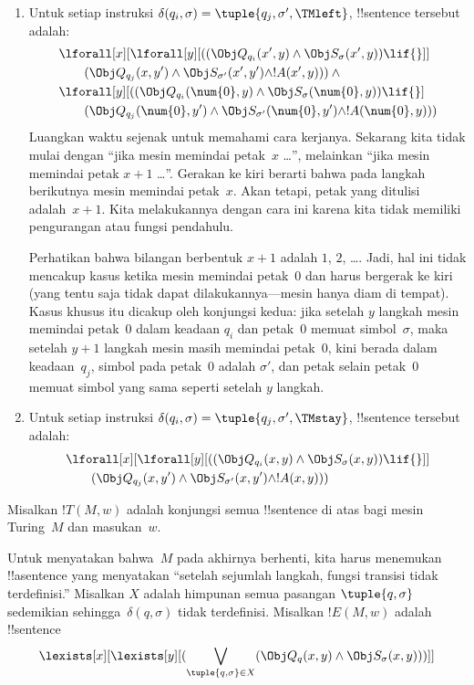 \documentclass[../../../include/open-logic-section]{subfiles}
\begin{document}
\begin{enumerate}
\begin{enumerate}
\item {} Untuk setiap instruksi $\delta(q_i, \sigma) =
  \tuple{q_j, \sigma', \TMleft}$, !!{sentence} tersebut adalah:
\begin{align*}
& \lforall[x][\lforall[y][
    ((\Obj Q_{q_i}(x', y) \land \Obj S_{\sigma}(x', y)) \lif {}]]\\
& \qquad   (\Obj Q_{q_j}(x, y') \land \Obj S_{\sigma'}(x', y') \land
!A(x', y))) \land {}\\
& \lforall[y][((\Obj Q_{q_i}(\num{0}, y) \land \Obj S_{\sigma}(\num{0},
    y)) \lif {}]\\
& \qquad (\Obj Q_{q_j}(\num{0}, y') \land \Obj S_{\sigma'}(\num{0},
  y') \land !A(\num{0}, y)))
\end{align*}
Luangkan waktu sejenak untuk memahami cara kerjanya. Sekarang kita tidak mulai
dengan ``jika mesin memindai petak~$x$ \dots'', melainkan ``jika mesin memindai
petak $x+1$ \dots''. Gerakan ke kiri berarti bahwa pada langkah berikutnya
mesin memindai petak~$x$. Akan tetapi, petak yang ditulisi adalah~$x+1$.
Kita melakukannya dengan cara ini karena kita tidak memiliki pengurangan atau
fungsi pendahulu.

Perhatikan bahwa bilangan berbentuk $x+1$ adalah $1$, $2$, \dots. Jadi, hal ini
tidak mencakup kasus ketika mesin memindai petak~$0$ dan harus bergerak ke kiri
(yang tentu saja tidak dapat dilakukannya---mesin hanya diam di tempat).
Kasus khusus itu dicakup oleh konjungsi kedua: jika setelah $y$ langkah mesin
memindai petak~$0$ dalam keadaan $q_i$ dan petak~$0$ memuat simbol~$\sigma$,
maka setelah $y+1$ langkah mesin masih memindai petak~$0$, kini berada dalam
keadaan~$q_j$, simbol pada petak~$0$ adalah $\sigma'$, dan petak selain
petak~$0$ memuat simbol yang sama seperti setelah $y$ langkah.
\item {} Untuk setiap instruksi $\delta(q_i, \sigma) =
  \tuple{q_j, \sigma', \TMstay}$, !!{sentence} tersebut adalah:
\begin{align*}
& \lforall[x][\lforall[y][(
   (\Obj Q_{q_i}(x, y) \land \Obj S_{\sigma}(x, y)) \lif {}]] \\
&\qquad   (\Obj Q_{q_j}(x, y') \land \Obj S_{\sigma'}(x, y') \land
!A(x, y)))
\end{align*}
\end{enumerate}
\end{enumerate}
Misalkan $!T(M, w)$ adalah konjungsi semua !!{sentence} di atas bagi mesin
Turing~$M$ dan masukan~$w$.

Untuk menyatakan bahwa~$M$ pada akhirnya berhenti, kita harus menemukan
!!a{sentence} yang menyatakan ``setelah sejumlah langkah, fungsi transisi tidak
terdefinisi.'' Misalkan $X$ adalah himpunan semua pasangan
$\tuple{q, \sigma}$ sedemikian sehingga~$\delta(q, \sigma)$ tidak terdefinisi.
Misalkan $!E(M, w)$ adalah !!{sentence}
\[
\lexists[x][\lexists[y][(\bigvee_{\tuple{q, \sigma} \in
      X}(\Obj Q_q(x, y) \land \Obj S_\sigma(x, y)))]]
\]
\end{document}
